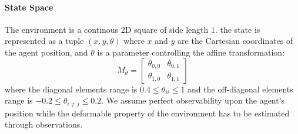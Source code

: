 \paragraph{State Space}
The environment is a continous 2D square of side length $1$.
the state is represented as a tuple $(x,y, \theta)$ where $x$ and $y$ are the Cartesian coordinates of the agent position, 
and $\theta$ is a parameter controlling the affine transformation: 
$$M_{\theta} = 
\begin{bmatrix}
\theta_{0,0} & \theta_{0,1} \\
\theta_{1,0} & \theta_{1,1}
\end{bmatrix}
$$  
where the diagonal elements range is $0.4 \leq \theta_{ii} \leq 1$ and the 
off-diagonal elements range is $-0.2 \leq \theta_{i\neq j} \leq 0.2$.
We assume perfect observability upon the agent's position while the deformable property 
of the environment has to be estimated through observations.

